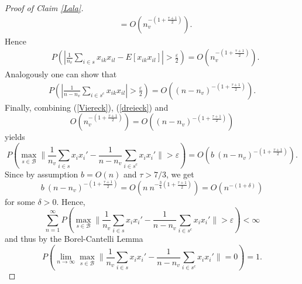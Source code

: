 \documentclass[Research_Module_ES.tex]{subfiles}
\begin{document}
\begin{proof}[Proof of Claim \ref{Lala}]
\begin{align*}
&=O\left(  n_v^{-\left( 1+\frac{\tau+1}{2}  \right)} \right).
\end{align*}
Hence
\begin{align*}
&P\left(\left| \frac{1}{n_v}\sum_{i\in s}x_{ik}x_{il}-E[x_{ik} x_{il}] \right|>\frac{\varepsilon}{2}\right)=O\left(n_v^{-\left(1+\frac{\tau+1}{2}\right)}\right).
\end{align*}
Analogously one can show that
\begin{align*}
P\left(\left| \frac{1}{n-n_v}\sum_{i\in s^c}x_{ik}x_{il}\right|>\frac{\varepsilon}{2}\right)=O\left((n-n_v)^{-\left(1+\frac{\tau+1}{2}\right)}\right).
\end{align*}
Finally, combining (\ref{Viereck}), (\ref{dreieck}) and 
\[
	O\left(n_v^{-\left(1+\frac{\tau+1}{2}\right)}\right)=O\left((n-n_v)^{-\left(1+\frac{\tau+1}{2}\right)}\right)
\]
yields 
\[
	P\left( \max_{s\in \mathcal{B}}\biggl\lVert \frac{1}{n_v}\sum_{i\in s}x_ix_i' - \frac{1}{n-n_v}\sum_{i\in s^c}x_ix_i'\biggr\rVert>\varepsilon\right)=O\left(b~(n-n_v)^{-\left(1+\frac{\tau+1}{2}\right)}\right).
\]
Since by assumption $b=O(n)$ and $\tau>7/3$, we get 
\[
	b~(n-n_v)^{-\left(1+\frac{\tau+1}{2}\right)}=O\left(n~n^{-\frac{3}{4}\left(1+\frac{\tau+1}{2}\right)}\right)=O\left(n^{-(1+\delta)}\right)
\]
for some $\delta>0$. Hence,
\[
	\sum_{n=1}^{\infty}P\left( \max_{s\in \mathcal{B}}\biggl\lVert \frac{1}{n_v}\sum_{i\in s}x_ix_i' - \frac{1}{n-n_v}\sum_{i\in s^c}x_ix_i'\biggr\rVert>\varepsilon\right)<\infty
\]
and thus by the Borel-Cantelli Lemma
\[
	P\left(\lim_{n\to\infty} \max_{s\in \mathcal{B}}\biggl\lVert \frac{1}{n_v}\sum_{i\in s}x_ix_i' - \frac{1}{n-n_v}\sum_{i\in s^c}x_ix_i'\biggr\rVert =0\right)=1.
\]
\end{proof}
\end{document}

